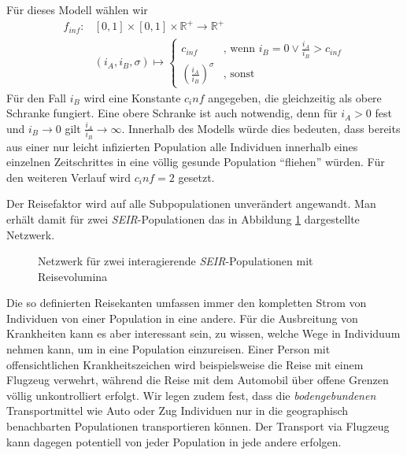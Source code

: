 Für dieses Modell wählen wir
\begin{align}
	f_{inf} :& [0,1]\times [0,1] \times \mathbb{R}^+ \rightarrow  \mathbb{R}^+\\
			 & (i_A,i_B,\sigma)\longmapsto								\begin{cases}c_{inf}&\text{, wenn } i_B = 0 \vee \frac{i_A}{i_B} > c_{inf} \\\left( \frac{i_A}{i_B}\right)^\sigma &\text{, sonst}\end{cases}\nonumber			  
\end{align}
Für den Fall $i_B$ wird eine Konstante $c_inf$ angegeben, die gleichzeitig als obere Schranke fungiert. Eine obere Schranke ist auch notwendig, denn für $i_A >0$ fest und $i_B\rightarrow 0$ gilt $\frac{i_A}{i_B}\rightarrow \infty$. Innerhalb des Modells würde dies bedeuten, dass bereits aus einer nur leicht infizierten Population alle Individuen innerhalb eines einzelnen Zeitschrittes in eine völlig gesunde Population ``fliehen'' würden. Für den weiteren Verlauf wird $c_inf = 2$ gesetzt. 

Der Reisefaktor wird auf alle Subpopulationen unverändert angewandt. Man erhält damit für zwei \emph{SEIR}-Populationen das in Abbildung \ref{fig:ssec:multiPop:travelSEIR} dargestellte Netzwerk.
\begin{figure}
\begin{center}
\end{center}
\caption{Netzwerk für zwei interagierende \emph{SEIR}-Populationen mit Reisevolumina}\label{fig:ssec:multiPop:travelSEIR}
\end{figure}
Die so definierten Reisekanten umfassen immer den kompletten Strom von Individuen von einer Population in eine andere. Für die Ausbreitung von Krankheiten kann es aber interessant sein, zu wissen, welche Wege in Individuum nehmen kann, um in eine Population einzureisen. Einer Person mit offensichtlichen Krankheitszeichen wird beispielsweise die Reise mit einem Flugzeug verwehrt, während die Reise mit dem Automobil über offene Grenzen völlig unkontrolliert erfolgt. Wir legen zudem fest, dass die \emph{bodengebundenen} Transportmittel wie Auto oder Zug Individuen nur in die geographisch benachbarten Populationen transportieren können. Der Transport via Flugzeug kann dagegen potentiell von jeder Population in jede andere erfolgen. 

